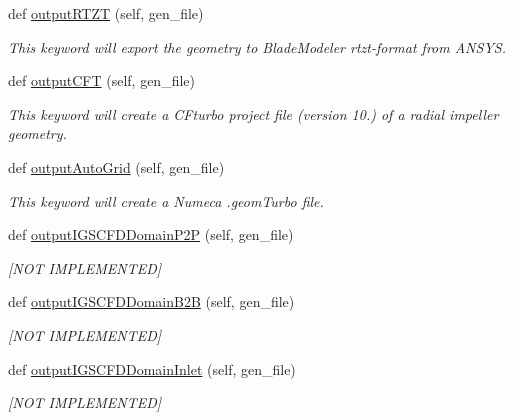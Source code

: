 \begin{DoxyCompactItemize}
def \hyperlink{classbladepro__modules_1_1inputfile__writer_1_1_input_writer_window_a27407b1e60e56fceec34147b9b793a74}{output\+R\+T\+ZT} (self, gen\+\_\+file)
\begin{DoxyCompactList}\small\item\em This keyword will export the geometry to Blade\+Modeler rtzt-\/format from A\+N\+S\+YS. \end{DoxyCompactList}\item 
def \hyperlink{classbladepro__modules_1_1inputfile__writer_1_1_input_writer_window_ad727ca92f2959a8d915939c73f3dbff1}{output\+C\+FT} (self, gen\+\_\+file)
\begin{DoxyCompactList}\small\item\em This keyword will create a C\+Fturbo project file (version 10.) of a radial impeller geometry. \end{DoxyCompactList}\item 
def \hyperlink{classbladepro__modules_1_1inputfile__writer_1_1_input_writer_window_a61f9db1d33a2cb583c3f779a94ec700d}{output\+Auto\+Grid} (self, gen\+\_\+file)
\begin{DoxyCompactList}\small\item\em This keyword will create a Numeca .geom\+Turbo file. \end{DoxyCompactList}\item 
def \hyperlink{classbladepro__modules_1_1inputfile__writer_1_1_input_writer_window_aa7a1b9b7db9021015b02a691075d88e3}{output\+I\+G\+S\+C\+F\+D\+Domain\+P2P} (self, gen\+\_\+file)
\begin{DoxyCompactList}\small\item\em \mbox{[}N\+OT I\+M\+P\+L\+E\+M\+E\+N\+T\+ED\mbox{]} \end{DoxyCompactList}\item 
def \hyperlink{classbladepro__modules_1_1inputfile__writer_1_1_input_writer_window_a8e556016279f9aabdabb9b6f708c95cb}{output\+I\+G\+S\+C\+F\+D\+Domain\+B2B} (self, gen\+\_\+file)
\begin{DoxyCompactList}\small\item\em \mbox{[}N\+OT I\+M\+P\+L\+E\+M\+E\+N\+T\+ED\mbox{]} \end{DoxyCompactList}\item 
def \hyperlink{classbladepro__modules_1_1inputfile__writer_1_1_input_writer_window_a1a577ed1880def26fc13d02701e9346a}{output\+I\+G\+S\+C\+F\+D\+Domain\+Inlet} (self, gen\+\_\+file)
\begin{DoxyCompactList}\small\item\em \mbox{[}N\+OT I\+M\+P\+L\+E\+M\+E\+N\+T\+ED\mbox{]} \end{DoxyCompactList}\item 

\end{DoxyCompactItemize}
